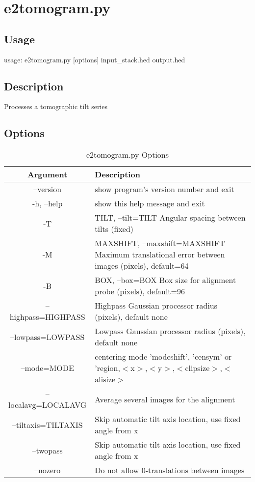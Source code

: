 \section{e2tomogram.py}  \label{e2tomogram.py}
\subsection{Usage}
usage: e2tomogram.py [options] input\_stack.hed output.hed


\subsection{Description}
Processes a tomographic tilt series




\subsection{Options}

\begin{longtable}{|c||p{3.5in}|}
\hline \bf{Argument} & \bf{Description}\endhead
\hline \multicolumn{2}{r}{{Continued on next page}} \endfoot
\hline \hline \caption[e2tomogram.py Options]{e2tomogram.py Options}\endlastfoot
\\\hline   --version  &  show program's version number and exit
\\\hline   -h, --help  &  show this help message and exit
\\\hline   -T  &  TILT, --tilt=TILT Angular spacing between tilts (fixed)
\\\hline   -M  &  MAXSHIFT, --maxshift=MAXSHIFT Maximum translational error between images (pixels), default=64
\\\hline   -B  &  BOX, --box=BOX Box size for alignment probe (pixels), default=96
\\\hline   --highpass=HIGHPASS  &  Highpass Gaussian processor radius (pixels), default none
\\\hline   --lowpass=LOWPASS  &  Lowpass Gaussian processor radius (pixels), default none
\\\hline   --mode=MODE  &  centering mode 'modeshift', 'censym' or 'region,$<$x$>$,$<$y$>$,$<$clipsize$>$,$<$alisize$>$
\\\hline   --localavg=LOCALAVG  &  Average several images for the alignment
\\\hline   --tiltaxis=TILTAXIS  &  Skip automatic tilt axis location, use fixed angle from x
\\\hline   --twopass  &  Skip automatic tilt axis location, use fixed angle from x
\\\hline
 --nozero  &  Do not allow 0-translations between images
\\\hline
\end{longtable}

